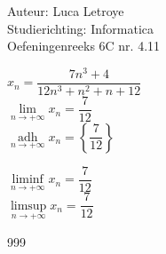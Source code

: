 \documentclass[a4paper]{article}
\begin{document}
  
\noindent \large Auteur: Luca Letroye \\
\noindent \large Studierichting: Informatica\\
\noindent \large Oefeningenreeks 6C nr. 4.11

\medskip
\normalsize

$x_n = \dfrac{7n^3+4}{12n^3+n^2+n+12}$\\

$\lim\limits_{n \rightarrow +\infty} x_n = \dfrac{7}{12}$\\

$\operatorname*{adh}\limits_{n \rightarrow +\infty} x_n = \left\{ \dfrac{7}{12} \right\}$

$\liminf\limits_{n \rightarrow +\infty} x_n =\dfrac{7}{12}$\\

$\limsup\limits_{n \rightarrow +\infty} x_n =\dfrac{7}{12}$\\






\begin{thebibliography}{999}
\end{thebibliography}
\end{document}
